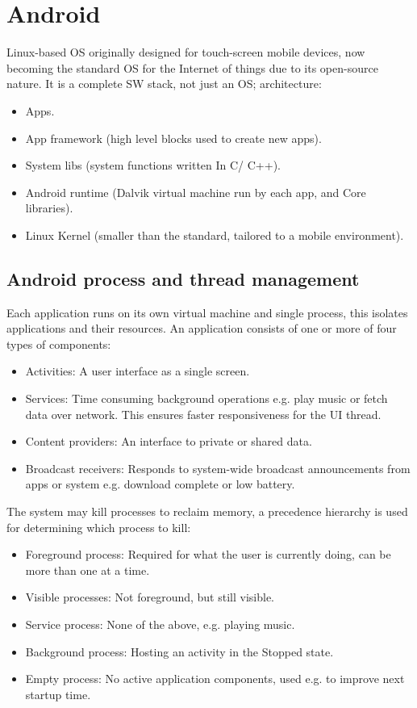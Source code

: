 \section{Android}
Linux-based OS originally designed for touch-screen mobile devices, now becoming the standard OS for the Internet of things due to its open-source nature. It is a complete SW stack, not just an OS; architecture:
\begin{itemize}
    \item Apps.
    \item App framework (high level blocks used to create new apps).
    \item System libs (system functions written In C/ C++).
    \item Android runtime (Dalvik virtual machine run by each app, and Core libraries).
    \item Linux Kernel (smaller than the standard, tailored to a mobile environment).
\end{itemize}

\subsection{Android process and thread management}
Each application runs on its own virtual machine and single process, this isolates applications and their resources. An application consists of one or more of four types of components:
\begin{itemize}
    \item Activities: A user interface as a single screen.
    \item Services: Time consuming background operations e.g. play music or fetch data over network. This ensures faster responsiveness for the UI thread.
    \item Content providers: An interface to private or shared data.
    \item Broadcast receivers: Responds to system-wide broadcast announcements from apps or system e.g. download complete or low battery.
\end{itemize}
The system may kill processes to reclaim memory, a precedence hierarchy is used for determining which process to kill:
\begin{itemize}
    \item Foreground process: Required for what the user is currently doing, can be more than one at a time.
    \item Visible processes: Not foreground, but still visible.
    \item Service process: None of the above, e.g. playing music.
    \item Background process: Hosting an activity in the Stopped state.
    \item Empty process: No active application components, used e.g. to improve next startup time.
\end{itemize}

